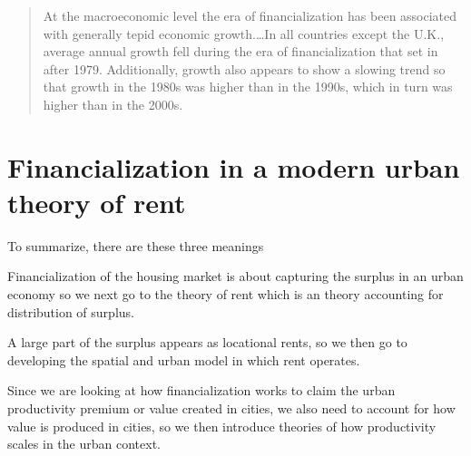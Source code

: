 \begin{quotation}At the macroeconomic level the era of financialization has been associated with generally tepid economic growth.\dots  In all countries except the U.K., average annual growth fell during the era of financialization that set in after 1979. Additionally, growth also appears to show a slowing trend so that growth in the 1980s was higher than in the 1990s, which in turn was higher than in the 2000s. \end{quotation}


\section{Financialization in a modern urban theory of rent}

To summarize, there are these three meanings 

Financialization of the housing market is about capturing the surplus in an urban economy so we next go to the theory of rent which is an theory accounting for distribution of surplus. 

A large part of the surplus appears as locational rents, so we then go to developing the spatial and urban model in which rent operates.  

Since we are looking at how financialization works to claim the urban productivity premium or value created in cities, we also need to account for how value is produced in cities, so we then introduce theories of how productivity scales in the urban context.


